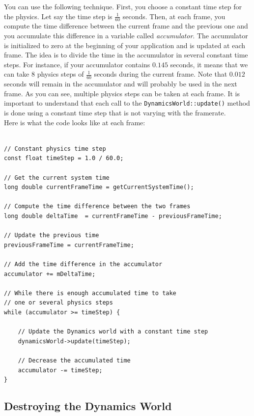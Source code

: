 \documentclass[a4paper,12pt]{article}
\begin{document}
    You can use the following technique. First, you choose a constant time step for the physics. Let say the time step is $\frac{1}{60}$ seconds. Then, at each frame,
    you compute the time difference between the current frame and the previous one and you accumulate this difference in a variable called \emph{accumulator}. The accumulator
    is initialized to zero at the beginning of your application and is updated at each frame. The idea is to divide the time in the accumulator in several constant time steps.
    For instance, if your accumulator contains $0.145$ seconds, it means that we can take $8$ physics steps of $\frac{1}{60}$ seconds during the current frame. Note that
    $0.012$ seconds will remain in the accumulator and will probably be used in the next frame. As you can see, multiple physics steps can be taken at each frame. It is
    important to understand that each call to the \texttt{DynamicsWorld::update()} method is done using a constant time step that is not varying with the framerate. \\

    Here is what the code looks like at each frame: \\

    \begin{lstlisting}

// Constant physics time step
const float timeStep = 1.0 / 60.0;

// Get the current system time
long double currentFrameTime = getCurrentSystemTime();

// Compute the time difference between the two frames
long double deltaTime  = currentFrameTime - previousFrameTime;

// Update the previous time
previousFrameTime = currentFrameTime;

// Add the time difference in the accumulator
accumulator += mDeltaTime;

// While there is enough accumulated time to take
// one or several physics steps
while (accumulator >= timeStep) {

    // Update the Dynamics world with a constant time step
    dynamicsWorld->update(timeStep);

    // Decrease the accumulated time
    accumulator -= timeStep;
}

    \end{lstlisting}


    \subsection{Destroying the Dynamics World}
\end{document}
